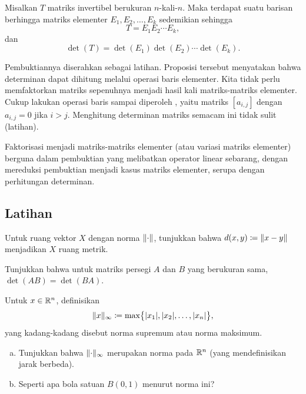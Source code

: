 \begin{prop} \label{prop:elemmatrixdecomp}
Misalkan $T$ matriks invertibel berukuran $n$-kali-$n$.  Maka terdapat suatu
barisan berhingga matriks elementer $E_1, E_2, \ldots, E_k$ sedemikian sehingga
\begin{equation*}
T = E_1 E_2 \cdots E_k ,
\end{equation*}
dan
\begin{equation*}
\det(T) = \det(E_1)\det(E_2)\cdots \det(E_k) .
\end{equation*}
\end{prop}

Pembuktiannya diserahkan sebagai latihan.
Proposisi tersebut menyatakan bahwa determinan dapat dihitung melalui operasi baris elementer.
Kita tidak perlu memfaktorkan matriks sepenuhnya menjadi hasil kali
matriks-matriks elementer.  Cukup lakukan operasi baris
sampai diperoleh \emph{}, yaitu matriks
$[a_{i,j}]$ dengan $a_{i,j} = 0$ jika $i > j$.  Menghitung determinan matriks
semacam ini tidak sulit (latihan).

Faktorisasi menjadi matriks-matriks elementer (atau variasi matriks elementer)
berguna dalam pembuktian yang melibatkan operator linear sebarang, dengan
mereduksi pembuktian menjadi kasus matriks elementer, serupa dengan perhitungan
determinan.


\subsection{Latihan}

\begin{exercise}
Untuk ruang vektor $X$ dengan norma $\lVert {\cdot} \rVert$, tunjukkan bahwa
$d(x,y) \coloneqq \lVert {x-y} \rVert$ menjadikan $X$ ruang metrik.
\end{exercise}

\begin{exercise}[Mudah]
Tunjukkan bahwa untuk matriks persegi $A$ dan $B$ yang berukuran sama,
$\det(AB) = \det(BA)$.
\end{exercise}

\begin{exercise}
Untuk $x \in {\mathbb{R}}^n$, definisikan
\begin{equation*}
\lVert {x} \rVert_{\infty} \coloneqq
\max \bigl\{ \lvert {x_1} \rvert, \lvert {x_2} \rvert, \ldots, \lvert {x_n} \rvert \bigr\} ,
\end{equation*}
yang kadang-kadang disebut norma supremum atau norma maksimum.
\begin{enumerate}[a)]
\item
Tunjukkan bahwa $\lVert {\cdot} \rVert_\infty$ merupakan norma pada ${\mathbb{R}}^n$ (yang mendefinisikan
jarak berbeda).
\item
Seperti apa bola satuan $B(0,1)$ menurut norma ini?
\end{enumerate}
\end{exercise}


